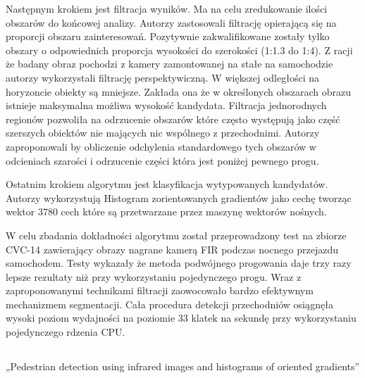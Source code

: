 	Następnym krokiem jest filtracja wyników. Ma na celu zredukowanie ilości obszarów do końcowej analizy. Autorzy zastosowali filtrację opierającą się na proporcji obszaru zainteresowań. Pozytywnie zakwalifikowane zostały tylko obszary o odpowiednich proporcja wysokości do szerokości (1:1.3 do 1:4). Z racji że badany obraz pochodzi z kamery zamontowanej na stałe na samochodzie autorzy wykorzystali filtrację perspektywiczną. W większej odległości na horyzoncie obiekty są mniejsze. Zakłada ona że w określonych obszarach obrazu istnieje maksymalna możliwa wysokość kandydata. Filtracja jednorodnych regionów pozwoliła na odrzucenie obszarów które często występują jako część szerszych obiektów nie mających nic wspólnego z przechodnimi. Autorzy zaproponowali by obliczenie odchylenia standardowego tych obszarów w odcieniach szarości i odrzucenie części która jest poniżej pewnego progu. 

	Ostatnim krokiem algorytmu jest klasyfikacja wytypowanych kandydatów. Autorzy wykorzystują Histogram zorientowanych gradientów jako cechę tworząc wektor 3780 cech które są przetwarzane przez maszynę wektorów nośnych.

	W celu zbadania dokładności algorytmu został przeprowadzony test na zbiorze CVC-14 zawierający obrazy nagrane kamerą FIR podczas nocnego przejazdu samochodem. Testy wykazały że metoda podwójnego progowania daje trzy razy lepsze rezultaty niż przy wykorzystaniu pojedynczego progu. Wraz z zaproponowanymi technikami filtracji zaowocowało bardzo efektywnym mechanizmem segmentacji. Cała procedura detekcji przechodniów osiągnęła wysoki poziom wydajności na poziomie 33 klatek na sekundę przy wykorzystaniu pojedynczego rdzenia CPU.

\subsection{}
„Pedestrian detection using infrared images and histograms of oriented gradients”

